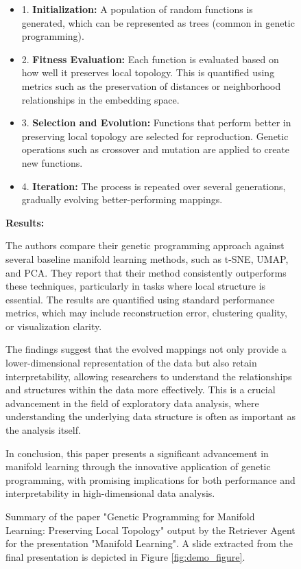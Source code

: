\documentclass[letterpaper]{article} %
\begin{document}
\begin{figure}
\begin{tcolorbox}[colback=gray!10,colframe=blue!70,title=Retriever Agent Case Study ,fonttitle=\bfseries]
\begin{itemize}
    \item 1. \textbf{Initialization:} A population of random functions is generated, which can be represented as trees (common in genetic programming).
    \item 2. \textbf{Fitness Evaluation:} Each function is evaluated based on how well it preserves local topology. This is quantified using metrics such as the preservation of distances or neighborhood relationships in the embedding space.
    \item 3. \textbf{Selection and Evolution:} Functions that perform better in preserving local topology are selected for reproduction. Genetic operations such as crossover and mutation are applied to create new functions.    
    \item 4. \textbf{Iteration:} The process is repeated over several generations, gradually evolving better-performing mappings.
\end{itemize}

\textbf{Results:}

The authors compare their genetic programming approach against several baseline manifold learning methods, such as t-SNE, UMAP, and PCA. They report that their method consistently outperforms these techniques, particularly in tasks where local structure is essential. The results are quantified using standard performance metrics, which may include reconstruction error, clustering quality, or visualization clarity.        

The findings suggest that the evolved mappings not only provide a lower-dimensional representation of the data but also retain interpretability, allowing researchers to understand the relationships and structures within the data more effectively. This is a crucial advancement in the field of exploratory data analysis, where understanding the underlying data structure is often as important as the analysis itself.

In conclusion, this paper presents a significant advancement in manifold learning through the innovative application of genetic programming, with promising implications for both performance and interpretability in high-dimensional data analysis.


\end{tcolorbox}
\caption{Summary of the paper "Genetic Programming for Manifold Learning: Preserving Local Topology" \citep{lensen2021genetic} output by the Retriever Agent for the presentation "Manifold Learning". A slide extracted from the final presentation is depicted in Figure \ref{fig:demo_figure}.}
\label{fig:summary_output}
\end{figure}
\end{document}
